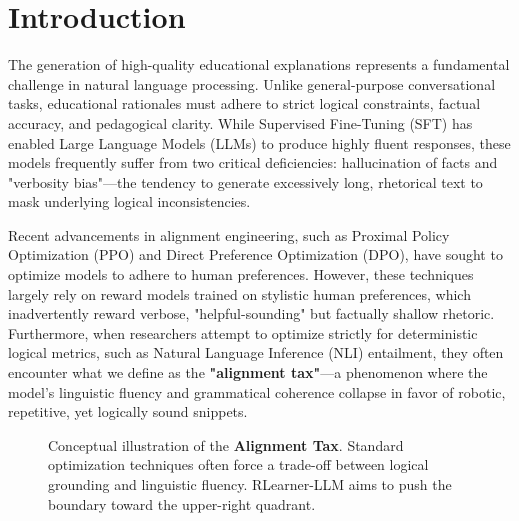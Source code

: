 \section{Introduction}

The generation of high-quality educational explanations represents a fundamental challenge in natural language processing. Unlike general-purpose conversational tasks, educational rationales must adhere to strict logical constraints, factual accuracy, and pedagogical clarity. While Supervised Fine-Tuning (SFT) has enabled Large Language Models (LLMs) to produce highly fluent responses, these models frequently suffer from two critical deficiencies: hallucination of facts and "verbosity bias"---the tendency to generate excessively long, rhetorical text to mask underlying logical inconsistencies.

Recent advancements in alignment engineering, such as Proximal Policy Optimization (PPO) and Direct Preference Optimization (DPO), have sought to optimize models to adhere to human preferences. However, these techniques largely rely on reward models trained on stylistic human preferences, which inadvertently reward verbose, "helpful-sounding" but factually shallow rhetoric. Furthermore, when researchers attempt to optimize strictly for deterministic logical metrics, such as Natural Language Inference (NLI) entailment, they often encounter what we define as the \textbf{"alignment tax"}---a phenomenon where the model's linguistic fluency and grammatical coherence collapse in favor of robotic, repetitive, yet logically sound snippets.

\begin{figure}[h]
\centering
{}
\caption{Conceptual illustration of the \textbf{Alignment Tax}. Standard optimization techniques often force a trade-off between logical grounding and linguistic fluency. RLearner-LLM aims to push the boundary toward the upper-right quadrant.}
\label{fig:alignment_tax}
\end{figure}

